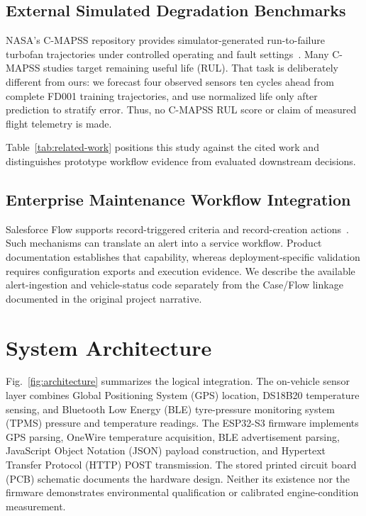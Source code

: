 \documentclass[conference]{IEEEtran}
\begin{document}
\subsection{External Simulated Degradation Benchmarks}
NASA's C-MAPSS repository provides simulator-generated run-to-failure turbofan
trajectories under controlled operating and fault settings~\cite{saxena2008}.
Many C-MAPSS studies target remaining useful life (RUL). That task is deliberately different from ours: we
forecast four observed sensors ten cycles ahead from complete FD001 training
trajectories, and use normalized life only after prediction to stratify error.
Thus, no C-MAPSS RUL score or claim of measured flight telemetry is made.

Table~\ref{tab:related-work} positions this study against the cited work and
distinguishes prototype workflow evidence from evaluated downstream decisions.

\begin{table}[!t]
\caption{Comparison with related work. ``Decision/workflow''
means an evaluated downstream decision, not merely an architecture diagram.}
\label{tab:related-work}
\centering\small
\setlength{\tabcolsep}{2pt}

\end{table}

\subsection{Enterprise Maintenance Workflow Integration}
Salesforce Flow supports record-triggered criteria and record-creation actions~\cite{salesforceflow}. Such mechanisms can translate an alert into a service workflow. Product documentation establishes that capability, whereas deployment-specific validation requires configuration exports and execution evidence. We describe the available alert-ingestion and vehicle-status code separately from the Case/Flow linkage documented in the original project narrative.

\section{System Architecture}
Fig.~\ref{fig:architecture} summarizes the logical integration. The on-vehicle sensor layer combines Global Positioning System (GPS) location, DS18B20 temperature sensing, and Bluetooth Low Energy (BLE) tyre-pressure monitoring system (TPMS) pressure and temperature readings. The ESP32-S3 firmware implements GPS parsing, OneWire temperature acquisition, BLE advertisement parsing, JavaScript Object Notation (JSON) payload construction, and Hypertext Transfer Protocol (HTTP) POST transmission. The stored printed circuit board (PCB) schematic documents the hardware design. Neither its existence nor the firmware demonstrates environmental qualification or calibrated engine-condition measurement.
\end{document}
